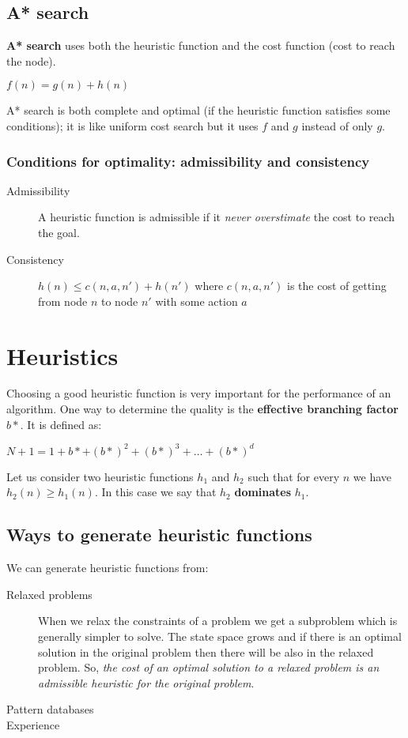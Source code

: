 \documentclass[a4paper, 11pt]{article}
\begin{document}
\subsection*{A* search}
\textbf{A* search} uses both the heuristic function and the cost function (cost to reach the node).

\indent $f(n) = g(n) + h(n)$

A* search is both complete and optimal (if the heuristic function satisfies some conditions); it is like uniform cost search but it uses $f$ and $g$ instead of only $g$.

\subsubsection*{Conditions for optimality: admissibility and consistency}
\begin{description}
  \item[Admissibility] A heuristic function is admissible if it \emph{never overstimate} the cost to reach the goal.
  \item[Consistency] $h(n) \le c(n, a, n') + h(n')$ where $c(n, a, n')$ is the cost of getting from node $n$ to node $n'$ with some action $a$
\end{description}

\section{Heuristics}
Choosing a good heuristic function is very important for the performance of an algorithm. One way to determine the quality is the \textbf{effective branching factor} $b*$.
It is defined as:

\indent $N + 1 = 1 + b* + (b*)^2 + (b*)^3 + \ldots + (b*)^d$

Let us consider two heuristic functions $h_1$ and $h_2$ such that for every $n$ we have $h_2(n) \ge h_1(n)$. In this case we say that $h_2$ \textbf{dominates} $h_1$.

\subsection*{Ways to generate heuristic functions}
We can generate heuristic functions from:
\begin{description}
  \item[Relaxed problems] When we relax the constraints of a problem we get a subproblem which is generally simpler to solve. The state space grows and if there is an optimal solution in the original problem then there will be also in the relaxed problem. So, \emph{the cost of an optimal solution to a relaxed problem is an admissible heuristic for the original problem}.
  \item[Pattern databases]
  \item[Experience]
\end{description}
\end{document}
